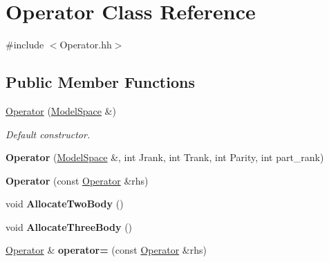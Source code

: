 \hypertarget{classOperator}{\section{Operator Class Reference}
\label{classOperator}
}


{\ttfamily \#include $<$Operator.\-hh$>$}

\subsection*{Public Member Functions}
\begin{DoxyCompactItemize}
\item 
\hypertarget{classOperator_ae59dd1e9ea828f88637f001e987195b6}{\hyperlink{classOperator_ae59dd1e9ea828f88637f001e987195b6}{Operator} (\hyperlink{classModelSpace}{Model\-Space} \&)}\label{classOperator_ae59dd1e9ea828f88637f001e987195b6}

\begin{DoxyCompactList}\small\item\em Default constructor. \end{DoxyCompactList}\item 
\hypertarget{classOperator_ab120301ff79330ae6593fd13445f24f1}{{\bfseries Operator} (\hyperlink{classModelSpace}{Model\-Space} \&, int Jrank, int Trank, int Parity, int part\-\_\-rank)}\label{classOperator_ab120301ff79330ae6593fd13445f24f1}

\item 
\hypertarget{classOperator_ae229a22ab49ca258f69c1c2c267b2aeb}{{\bfseries Operator} (const \hyperlink{classOperator}{Operator} \&rhs)}\label{classOperator_ae229a22ab49ca258f69c1c2c267b2aeb}

\item 
\hypertarget{classOperator_aed04ab87654d93c3d1eec86860e41594}{void {\bfseries Allocate\-Two\-Body} ()}\label{classOperator_aed04ab87654d93c3d1eec86860e41594}

\item 
\hypertarget{classOperator_a72bde59e35fc1f0eb8b12286c411c7e9}{void {\bfseries Allocate\-Three\-Body} ()}\label{classOperator_a72bde59e35fc1f0eb8b12286c411c7e9}

\item 
\hypertarget{classOperator_afad114ba9dee8b9c08af0b5d27c3ba86}{\hyperlink{classOperator}{Operator} \& {\bfseries operator=} (const \hyperlink{classOperator}{Operator} \&rhs)}\label{classOperator_afad114ba9dee8b9c08af0b5d27c3ba86}


\end{DoxyCompactItemize}
